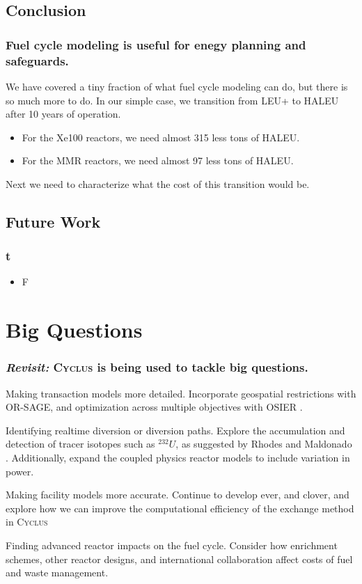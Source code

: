 \documentclass[9pt]{beamer}
\newcommand{\cyclus}{\textsc{Cyclus}\xspace}
\begin{document}
  \subsection{Conclusion}
  \begin{frame}
      \frametitle{Fuel cycle modeling is useful for enegy planning and safeguards.}
      We have covered a tiny fraction of what fuel cycle modeling can do, but there is so much more to do. In our simple case, we transition from LEU+ to HALEU after 10 years of operation.
      \begin{itemize}
          \item For the Xe100 reactors, we need almost 315 less tons of HALEU.
          \item For the MMR reactors, we need almost 97 less tons of HALEU.
      \end{itemize}
      Next we need to characterize what the cost of this transition would be.
  \end{frame}


  \subsection{Future Work}
  \begin{frame}
      \frametitle{t}
      \begin{itemize}
          \item F
      \end{itemize}
  \end{frame}

  \section{Big Questions}
  \begin{frame}
    \frametitle{\textit{Revisit:} \cyclus is being used to tackle big questions.}
    \begin{block}{Making transaction models more detailed.}
        Incorporate geospatial restrictions with OR-SAGE, and optimization across multiple objectives with OSIER \cite{Dotson_osier}.
    \end{block}
    \begin{block}{Identifying realtime diversion or diversion paths.}
        Explore the accumulation and detection of tracer isotopes such as $^{232}U$, as suggested by Rhodes and Maldonado \cite{rhodes_u232}. Additionally, expand the coupled physics reactor models to include variation in power.
    \end{block}
    \begin{block}{Making facility models more accurate.}
      Continue to develop \gls{ever}, and \gls{clover}, and explore how we can improve the computational efficiency of the exchange method in \cyclus
    \end{block}
    \begin{block}{Finding advanced reactor impacts on the fuel cycle.}
      Consider how enrichment schemes, other reactor designs, and international collaboration affect costs of fuel and waste management.
    \end{block}
  \end{frame}
\end{document}
